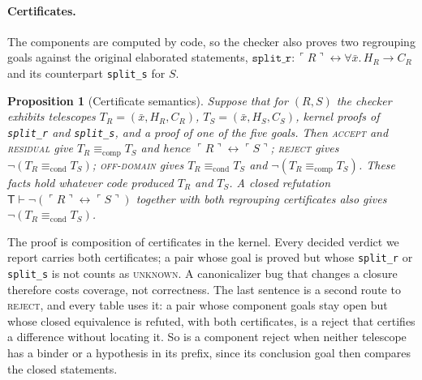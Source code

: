 \documentclass[10pt]{article}
\newtheorem{proposition}[theorem]{Proposition}
\theoremstyle{definition}
\newcommand{\T}{\mathsf{T}}
\newcommand{\Cl}[1]{\ulcorner #1 \urcorner}
\newcommand{\Econd}{\mathrel{\equiv_{\mathrm{cond}}}}
\newcommand{\Ecomp}{\mathrel{\equiv_{\mathrm{comp}}}}
\newcommand{\V}[1]{\textsc{#1}}
\begin{document}
\paragraph{Certificates.} The components are computed by code, so the checker also proves two
regrouping goals against the original elaborated statements,
$\texttt{split\_r}:\Cl R\leftrightarrow\forall\bar x.\,H_R\to C_R$ and its counterpart
\texttt{split\_s} for $S$.

\begin{proposition}[Certificate semantics]\label{prop:cert}
Suppose that for $(R,S)$ the checker exhibits telescopes $T_R=(\bar x,H_R,C_R)$,
$T_S=(\bar x,H_S,C_S)$, kernel proofs of \texttt{split\_r} and \texttt{split\_s}, and a proof of one
of the five goals. Then \V{accept} and \V{residual} give $T_R\Ecomp T_S$ and hence $\Cl R\leftrightarrow\Cl S$;
\V{reject} gives $\neg(T_R\Econd T_S)$; \V{off-domain} gives $T_R\Econd T_S$ and
$\neg(T_R\Ecomp T_S)$. These facts hold whatever code produced $T_R$ and $T_S$. A closed
refutation $\T\vdash\neg(\Cl R\leftrightarrow\Cl S)$ together with both regrouping certificates
also gives $\neg(T_R\Econd T_S)$.
\end{proposition}

The proof is composition of certificates in the kernel. Every decided verdict we report carries
both certificates; a pair whose goal is proved but whose \texttt{split\_r} or \texttt{split\_s}
is not counts as \V{unknown}. A canonicalizer bug that changes a closure therefore costs coverage,
not correctness. The last sentence is a second route to \V{reject}, and every table uses it: a
pair whose component goals stay open but whose closed equivalence is refuted, with both
certificates, is a reject that certifies a difference without locating it. So is a component
reject when neither telescope has a binder or a hypothesis in its prefix, since its conclusion
goal then compares the closed statements.
\end{document}
